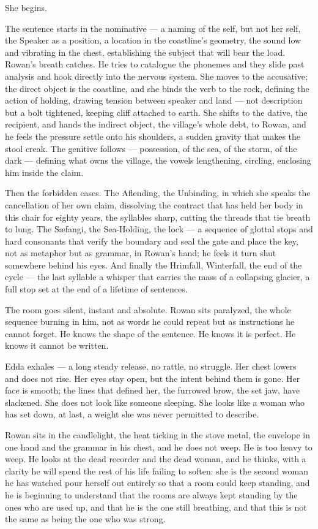 \documentclass[11pt,oneside]{book}
\begin{document}
She begins.

The sentence starts in the nominative --- a naming of the self, but not
her self, the Speaker as a position, a location in the coastline's
geometry, the sound low and vibrating in the chest, establishing the
subject that will bear the load. Rowan's breath catches. He tries to
catalogue the phonemes and they slide past analysis and hook directly
into the nervous system. She moves to the accusative; the direct object
is the coastline, and she binds the verb to the rock, defining the
action of holding, drawing tension between speaker and land --- not
description but a bolt tightened, keeping cliff attached to earth. She
shifts to the dative, the recipient, and hands the indirect object, the
village's whole debt, to Rowan, and he feels the pressure settle onto
his shoulders, a sudden gravity that makes the stool creak. The genitive
follows --- possession, of the sea, of the storm, of the dark ---
defining what owns the village, the vowels lengthening, circling,
enclosing him inside the claim.

Then the forbidden cases. The Aflending, the Unbinding, in which she
speaks the cancellation of her own claim, dissolving the contract that
has held her body in this chair for eighty years, the syllables sharp,
cutting the threads that tie breath to lung. The Sæfangi, the
Sea-Holding, the lock --- a sequence of glottal stops and hard
consonants that verify the boundary and seal the gate and place the key,
not as metaphor but as grammar, in Rowan's hand; he feels it turn shut
somewhere behind his eyes. And finally the Hrimfall, Winterfall, the end
of the cycle --- the last syllable a whisper that carries the mass of a
collapsing glacier, a full stop set at the end of a lifetime of
sentences.

The room goes silent, instant and absolute. Rowan sits paralyzed, the
whole sequence burning in him, not as words he could repeat but as
instructions he cannot forget. He knows the shape of the sentence. He
knows it is perfect. He knows it cannot be written.

Edda exhales --- a long steady release, no rattle, no struggle. Her
chest lowers and does not rise. Her eyes stay open, but the intent
behind them is gone. Her face is smooth; the lines that defined her, the
furrowed brow, the set jaw, have slackened. She does not look like
someone sleeping. She looks like a woman who has set down, at last, a
weight she was never permitted to describe.

Rowan sits in the candlelight, the heat ticking in the stove metal, the
envelope in one hand and the grammar in his chest, and he does not weep.
He is too heavy to weep. He looks at the dead recorder and the dead
woman, and he thinks, with a clarity he will spend the rest of his life
failing to soften: she is the second woman he has watched pour herself
out entirely so that a room could keep standing, and he is beginning to
understand that the rooms are always kept standing by the ones who are
used up, and that he is the one still breathing, and that this is not
the same as being the one who was strong.
\end{document}
